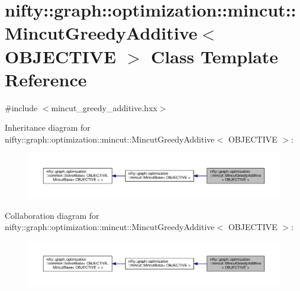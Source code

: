 \hypertarget{classnifty_1_1graph_1_1optimization_1_1mincut_1_1MincutGreedyAdditive}{}\section{nifty\+:\+:graph\+:\+:optimization\+:\+:mincut\+:\+:Mincut\+Greedy\+Additive$<$ O\+B\+J\+E\+C\+T\+I\+V\+E $>$ Class Template Reference}
\label{classnifty_1_1graph_1_1optimization_1_1mincut_1_1MincutGreedyAdditive}


{\ttfamily \#include $<$mincut\+\_\+greedy\+\_\+additive.\+hxx$>$}



Inheritance diagram for nifty\+:\+:graph\+:\+:optimization\+:\+:mincut\+:\+:Mincut\+Greedy\+Additive$<$ O\+B\+J\+E\+C\+T\+I\+V\+E $>$\+:\nopagebreak
\begin{figure}[H]
\begin{center}
\leavevmode
\includegraphics[width=350pt]{classnifty_1_1graph_1_1optimization_1_1mincut_1_1MincutGreedyAdditive__inherit__graph}
\end{center}
\end{figure}


Collaboration diagram for nifty\+:\+:graph\+:\+:optimization\+:\+:mincut\+:\+:Mincut\+Greedy\+Additive$<$ O\+B\+J\+E\+C\+T\+I\+V\+E $>$\+:\nopagebreak
\begin{figure}[H]
\begin{center}
\leavevmode
\includegraphics[width=350pt]{classnifty_1_1graph_1_1optimization_1_1mincut_1_1MincutGreedyAdditive__coll__graph}
\end{center}
\end{figure}
